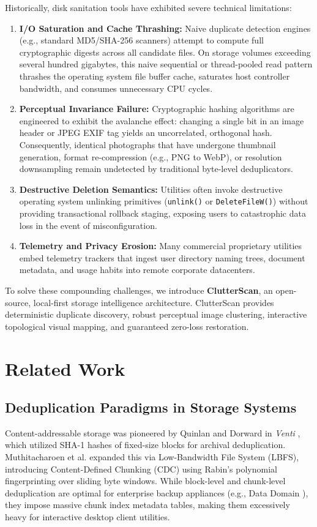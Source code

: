 \documentclass[journal,compsoc,10pt,twocolumn]{IEEEtran}
\begin{document}
Historically, disk sanitation tools have exhibited severe technical limitations:
\begin{enumerate}
    \item \textbf{I/O Saturation and Cache Thrashing:} Naive duplicate detection engines (e.g., standard MD5/SHA-256 scanners) attempt to compute full cryptographic digests across all candidate files. On storage volumes exceeding several hundred gigabytes, this naive sequential or thread-pooled read pattern thrashes the operating system file buffer cache, saturates host controller bandwidth, and consumes unnecessary CPU cycles.
    \item \textbf{Perceptual Invariance Failure:} Cryptographic hashing algorithms are engineered to exhibit the avalanche effect: changing a single bit in an image header or JPEG EXIF tag yields an uncorrelated, orthogonal hash. Consequently, identical photographs that have undergone thumbnail generation, format re-compression (e.g., PNG to WebP), or resolution downsampling remain undetected by traditional byte-level deduplicators.
    \item \textbf{Destructive Deletion Semantics:} Utilities often invoke destructive operating system unlinking primitives (\texttt{unlink()} or \texttt{DeleteFileW()}) without providing transactional rollback staging, exposing users to catastrophic data loss in the event of misconfiguration.
    \item \textbf{Telemetry and Privacy Erosion:} Many commercial proprietary utilities embed telemetry trackers that ingest user directory naming trees, document metadata, and usage habits into remote corporate datacenters.
\end{enumerate}

To solve these compounding challenges, we introduce \textbf{ClutterScan}, an open-source, local-first storage intelligence architecture. ClutterScan provides deterministic duplicate discovery, robust perceptual image clustering, interactive topological visual mapping, and guaranteed zero-loss restoration.

\section{Related Work}
\label{sec:related}

\subsection{Deduplication Paradigms in Storage Systems}
Content-addressable storage was pioneered by Quinlan and Dorward in \textit{Venti} \cite{quinlan2002venti}, which utilized SHA-1 hashes of fixed-size blocks for archival deduplication. Muthitacharoen et al. \cite{muthitacharoen2001lbfs} expanded this via Low-Bandwidth File System (LBFS), introducing Content-Defined Chunking (CDC) using Rabin's polynomial fingerprinting \cite{rabin1981fingerprinting} over sliding byte windows. While block-level and chunk-level deduplication are optimal for enterprise backup appliances (e.g., Data Domain \cite{zhu2008data}), they impose massive chunk index metadata tables, making them excessively heavy for interactive desktop client utilities.
\end{document}
